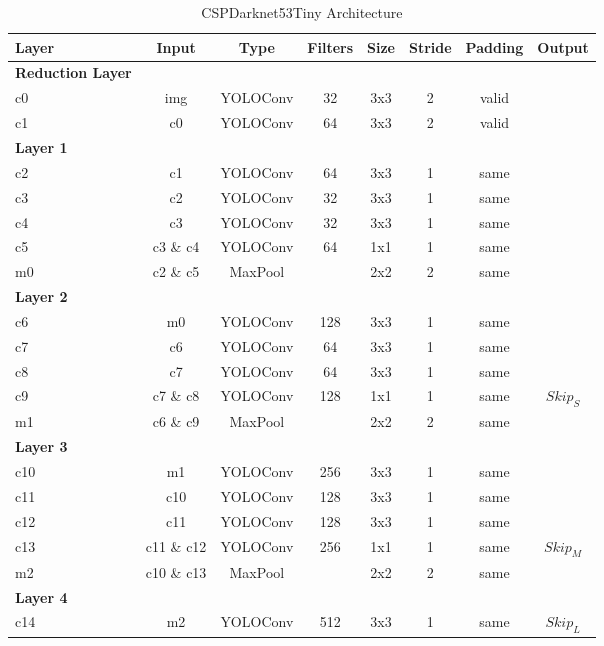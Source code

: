 \begin{table} %
\begin{center}

\begin{tabular}{l|c|c|c|c|c|c|c}
    \textbf{Layer} & \textbf{Input} & \textbf{Type} & \textbf{Filters} & \textbf{Size} & \textbf{Stride} & \textbf{Padding} & \textbf{Output} \\
    \hline
    \textbf{Reduction Layer} & & & & & &\\
    c0 & img & YOLOConv & 32 & 3x3 & 2 & valid\\
    c1 & c0 & YOLOConv & 64 & 3x3 & 2 & valid\\
    \textbf{Layer 1} & & & & & &\\
    c2 & c1 & YOLOConv & 64 & 3x3 & 1 & same\\
    c3 & c2 & YOLOConv & 32 & 3x3 & 1 & same\\
    c4 & c3 & YOLOConv & 32 & 3x3 & 1 & same\\
    c5 & c3 \& c4 & YOLOConv & 64 & 1x1 & 1 & same\\
    m0 & c2 \& c5 & MaxPool &  & 2x2 & 2 & same\\
    \textbf{Layer 2} & & & & & &\\
    c6 & m0 & YOLOConv & 128 & 3x3 & 1 & same\\
    c7 & c6 & YOLOConv & 64 & 3x3 & 1 & same\\
    c8 & c7 & YOLOConv & 64 & 3x3 & 1 & same\\
    c9 & c7 \& c8 & YOLOConv & 128 & 1x1 & 1 & same & $Skip_S$\\
    m1 & c6 \& c9 & MaxPool & & 2x2  & 2 & same\\
    \textbf{Layer 3} & & & & & &\\
    c10 & m1 & YOLOConv & 256 & 3x3 & 1 & same\\
    c11 & c10 & YOLOConv & 128 & 3x3 & 1 & same\\
    c12 & c11 & YOLOConv & 128 & 3x3 & 1 & same\\
    c13 & c11 \& c12 & YOLOConv &  256 & 1x1 & 1 & same & $Skip_M$\\
    m2 & c10 \& c13 & MaxPool & & 2x2 & 2 & same\\
    \textbf{Layer 4} & & & & & &\\
    c14 & m2 & YOLOConv & 512 & 3x3 & 1 & same & $Skip_L$\\
\end{tabular}

\caption{CSPDarknet53Tiny Architecture}
\label{tab:darknet_tiny_arch}
\end{center}
\end{table}

